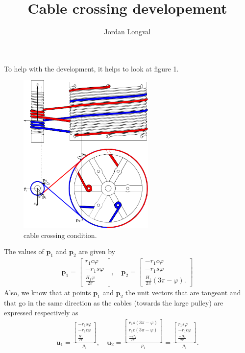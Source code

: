 \documentclass[12pt,letterpaper]{article}
\author{Jordan Longval}
\title{Cable crossing developement}
\begin{document}
\maketitle
To help with the development, it helps to look at figure 1. 
\begin{figure}[!h]
\centering
\includegraphics[width=0.6\textwidth]{fig_1.pdf} 
\caption{cable crossing condition.}
\end{figure}
The values of $\mathbf{p}_1$ and $\mathbf{p}_2$ are given by
\begin{align}
\mathbf{p}_1 = \begin{bmatrix}
r_1c\varphi\\
-r_1s\varphi\\\frac{H_1\varphi}{2\pi}
\end{bmatrix},\quad \mathbf{p}_2 = \begin{bmatrix}
-r_1c\varphi\\-r_1s\varphi\\\frac{H_1}{2\pi}(3\pi-\varphi).
\end{bmatrix}
\label{eq_1}
\end{align}
Also, we know that at points $\mathbf{p}_1$ and $\mathbf{p}_2$ the unit vectors that are tangeant and that go in the same direction as the cables (towards the large pulley) are expressed respectively as
\begin{align}
\mathbf{u}_1 = \frac{\begin{bmatrix}
-r_1s\varphi\\
-r_1c\varphi\\
\frac{H_1}{2\pi}
\end{bmatrix}}{\rho_1},
\quad \mathbf{u}_2 = \frac{\begin{bmatrix}
r_1s(3\pi-\varphi)\\
r_1c(3\pi-\varphi)\\
\frac{-H_1}{2\pi}
\end{bmatrix}}{\rho_1}=\frac{\begin{bmatrix}
r_1s\varphi\\
-r_1c\varphi\\
\frac{-H_1}{2\pi}
\end{bmatrix}}{\rho_1}.
\label{eq_2}
\end{align}
\end{document}
